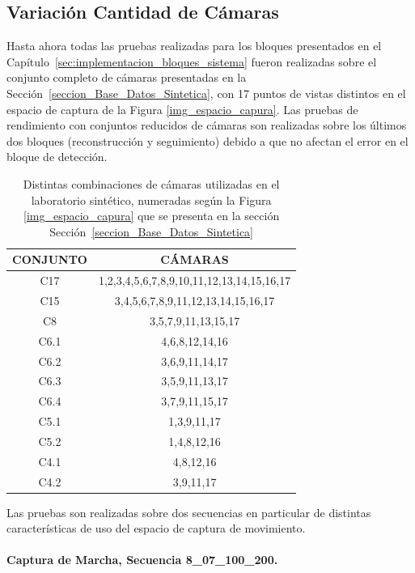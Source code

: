 \subsection{Variación Cantidad de Cámaras}

Hasta ahora todas las pruebas realizadas para los bloques presentados en el Capítulo~\ref{sec:implementacion_bloques_sistema} fueron realizadas sobre el conjunto completo de cámaras presentadas en la Sección~\ref{seccion_Base_Datos_Sintetica}, con 17 puntos de vistas distintos en el espacio de captura de la Figura \ref{img_espacio_capura}. Las pruebas de rendimiento con conjuntos reducidos de cámaras son realizadas sobre los últimos dos bloques (reconstrucción y seguimiento) debido a que no afectan el error en el bloque de detección.

\begin{table}[ht!]
\centering
\begin{tabular}{|c|c|}
\hline
\textbf{CONJUNTO} & \textbf{CÁMARAS} \\ \hline
C17 & 1,2,3,4,5,6,7,8,9,10,11,12,13,14,15,16,17 \\ \hline
C15 & 3,4,5,6,7,8,9,11,12,13,14,15,16,17 \\ \hline
C8 & 3,5,7,9,11,13,15,17 \\ \hline
C6.1 & 4,6,8,12,14,16 \\ \hline
C6.2 & 3,6,9,11,14,17 \\ \hline
C6.3 & 3,5,9,11,13,17 \\ \hline
C6.4 & 3,7,9,11,15,17 \\ \hline
C5.1 & 1,3,9,11,17 \\ \hline
C5.2 & 1,4,8,12,16 \\ \hline
C4.1 & 4,8,12,16 \\ \hline
C4.2 & 3,9,11,17 \\ \hline
\end{tabular}
\caption{Distintas combinaciones de cámaras utilizadas en el laboratorio sintético, numeradas según la Figura \ref{img_espacio_capura} que se presenta en la sección Sección~\ref{seccion_Base_Datos_Sintetica} }
\end{table}

Las pruebas son realizadas sobre dos secuencias en particular de distintas características de uso del espacio de captura de movimiento.

\paragraph{Captura de Marcha, Secuencia 8\_07\_100\_200.}

